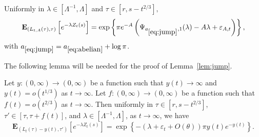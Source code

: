 \documentclass[AHL,Unicode,longabstracts,published]{cedram}
\newcommand*\eps{\varepsilon}
\newcommand*\E{\mathbf{E}}
\newcommand{\1} {\mathds{1}}
\renewcommand*\to{\rightarrow}
\begin{document}
\begin{lemm}\label{lem:jump}
Uniformly in $\lambda \in [\Lambda^{-1},\Lambda]$ and $\tau\in[r,s-t^{2/3}],$
\begin{equation}\label{eq:jump}
\E_{\left(L_{t,A}(\tau),\tau\right)} \left[e^{-\lambda Z_t(s)}\right] =\exp \left\{\pi e^{-A}\left(\Psi_{a_{\eqref{eq:jump}},1}(\lambda) - A\lambda + \eps_{A,t}\right) \right\},
\end{equation}
with $a_{\eqref{eq:jump}} = a_{\eqref{eq:abelian}}+\log \pi$.
\end{lemm}

The following lemma will be needed for the proof of Lemma~\ref{lem:jump}.

\begin{lemm}\label{lem:deriv_appears}
Let $y: (0, \infty) \rightarrow (0, \infty)$ be a function such that $y(t)\to\infty$ and $y(t) = o(t^{1/3})$ as $t\to\infty$. Let $f: (0, \infty) \rightarrow (0, \infty)$ be a function such that $f(t) = o(t^{2/3})$ as $t\to\infty$. Then uniformly in $\tau\in[r,s-t^{2/3}]$, $\tau'\in [\tau,\tau+f(t)]$, and $\lambda \in [\Lambda^{-1},\Lambda]$, as $t\to\infty$, we have
\begin{equation}
\E_{\left(L_t(\tau)-y(t),\tau'\right)}\left[e^{-\lambda Z_t(s)}\right] = \exp\left\{-\left(\lambda+\eps_t+O(\theta)\right)\pi y(t)e^{-y(t)}\right\}.
\end{equation}
\end{lemm}
\end{document}
